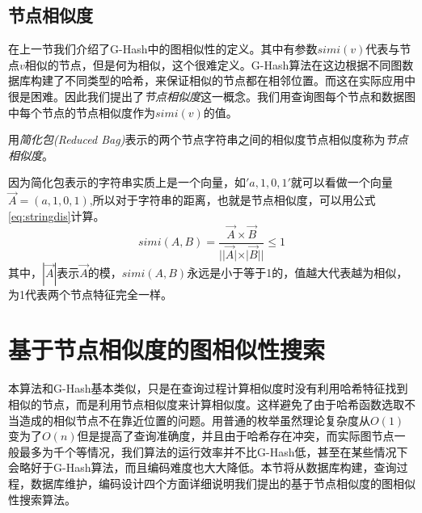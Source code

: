 \documentclass{XDBAthesis}
\begin{document}
\subsection{节点相似度}
在上一节我们介绍了G-Hash中的图相似性的定义。其中有参数$simi(v)$代表与节点$v$相似的节点，但是何为相似，这个很难定义。G-Hash算法在这边根据不同图数据库构建了不同类型的哈希，来保证相似的节点都在相邻位置。而这在实际应用中很是困难。因此我们提出了\emph{节点相似度}这一概念。我们用查询图每个节点和数据图中每个节点的节点相似度作为$simi(v)$的值。
\begin{defn}[节点相似度]
    用\emph{简化包(Reduced Bag)}表示的两个节点字符串之间的相似度节点相似度称为\emph{节点相似度}。
\end{defn}
因为简化包表示的字符串实质上是一个向量，如$'a,1,0,1'$就可以看做一个向量$\vec{A}=(a,1,0,1) $,所以对于字符串的距离，也就是节点相似度，可以用公式\eqref{eq:stringdis}计算。
\begin{equation}
    simi(A,B)=\frac{\vec{A}\times \vec{B}}{||\vec{A}|\times |\vec{B}||} \leq 1
    \label{eq:stringdis}
\end{equation}
其中，$|\vec{A}|$表示$\vec{A}$的模，$simi(A,B)$永远是小于等于1的，值越大代表越为相似，为1代表两个节点特征完全一样。
\section{基于节点相似度的图相似性搜索}
本算法和G-Hash\cite{ghash}基本类似，只是在查询过程计算相似度时没有利用哈希特征找到相似的节点，而是利用节点相似度来计算相似度。这样避免了由于哈希函数选取不当造成的相似节点不在靠近位置的问题。用普通的枚举虽然理论复杂度从$O(1)$变为了$O(n)$但是提高了查询准确度，并且由于哈希存在冲突，而实际图节点一般最多为千个等情况，我们算法的运行效率并不比G-Hash低，甚至在某些情况下会略好于G-Hash算法，而且编码难度也大大降低。本节将从数据库构建，查询过程，数据库维护，编码设计四个方面详细说明我们提出的基于节点相似度的图相似性搜索算法。
\end{document}
